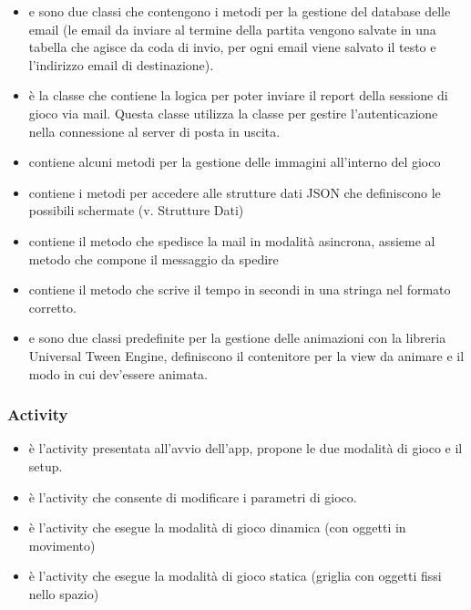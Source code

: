 \begin{itemize}
\item {} e  sono due classi che contengono i metodi per la gestione del database delle email (le email da inviare al termine della partita vengono salvate in una tabella che agisce da coda di invio, per ogni email viene salvato il testo e l'indirizzo email di destinazione).
\item {} è la classe che contiene la logica per poter inviare il report della sessione di gioco via mail. Questa classe utilizza la classe  per gestire l'autenticazione nella connessione al server di posta in uscita.
\item {} contiene alcuni metodi per la gestione delle immagini all'interno del gioco
\item {} contiene i metodi per accedere alle strutture dati JSON che definiscono le possibili schermate (v. Strutture Dati)
\item {} contiene il metodo che spedisce la mail in modalità asincrona, assieme al metodo che compone il messaggio da spedire
\item {} contiene il metodo che scrive il tempo in secondi in una stringa nel formato corretto.
\item {} e  sono due classi predefinite per la gestione delle animazioni con la libreria Universal Tween Engine, definiscono il contenitore per la view da animare e il modo in cui dev'essere animata.
\end{itemize}

\subsubsection{Activity}

\begin{itemize}
\item {} è l'activity presentata all'avvio dell'app, propone le due modalità di gioco e il setup.
\item {} è l'activity che consente di modificare i parametri di gioco.
\item {} è l'activity che esegue la modalità di gioco dinamica (con oggetti in movimento)
\item {} è l'activity che esegue la modalità di gioco statica (griglia con oggetti fissi nello spazio)
\end{itemize}

